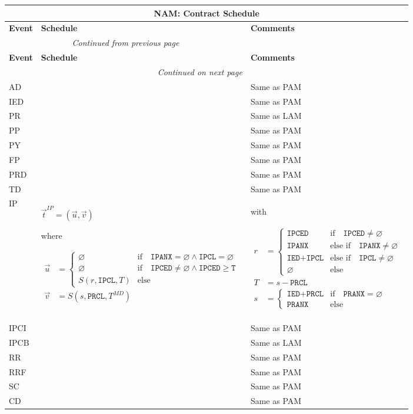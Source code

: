 \documentclass[9pt,oneside]{amsart}
\newenvironment{schedule}[1]{
	\begin{longtable}[H]{| p{0.05\textwidth} | p{0.5\textwidth} |  p{0.4\textwidth} |}
	\multicolumn{3}{c}{\textbf{#1: Contract Schedule}}\\
	\hline
	\textbf{Event} & \textbf{Schedule} & \textbf{Comments} \\
	\hline
	\endfirsthead
	\multicolumn{2}{c}{\textit{Continued from previous page}} \\
	\hline
	\textbf{Event} & \textbf{Schedule} & \textbf{Comments} \\
	\hline
	\endhead
	\hline \multicolumn{2}{r}{\textit{Continued on next page}} \\
	\endfoot
	\hline
	\endlastfoot
}{%
	\hline
	\end{longtable}
}
\newcommand{\attr}[1]{\texttt{#1}}
\newcommand{\sdl}[3]{S(#1,#2,#3)}
\newcommand{\undef}{\varnothing}
\begin{document}
\begin{schedule}{NAM}
	AD & & Same as PAM \\
	\hline
	IED & & Same as PAM \\
	\hline
	PR & & Same as LAM \\
	\hline
	PP & & Same as PAM \\
	\hline
	PY & & Same as PAM \\
	\hline
	FP & & Same as PAM \\
	\hline
	PRD & & Same as PAM \\
	\hline
	TD & & Same as PAM \\
	\hline
	IP & $\vec{t}^{IP} = (\vec{u},\vec{v})$ \par
		where \par
		{$\begin{aligned} \vec{u} &= \begin{cases} \undef & \text{if}\quad \attr{IPANX}=\undef\land\attr{IPCL}=\undef \\
							\undef & \text{if}\quad \attr{IPCED}\neq\undef\land\attr{IPCED}\geq\attr{T}\\
							\sdl{r}{\attr{IPCL}}{T} & \text{else} \end{cases} \\
				\vec{v} &= \sdl{s}{\attr{PRCL}}{T^{MD}} \end{aligned}$}
		 & with\par {$\begin{aligned} r &= \begin{cases} \attr{IPCED} & \text{if}\quad \attr{IPCED}\neq\undef \\
								\attr{IPANX} & \text{else if}\quad \attr{IPANX}\neq\undef \\
								\attr{IED}+\attr{IPCL} & \text{else if}\quad \attr{IPCL}\neq\undef \\
								\undef & \text{else} \end{cases} \\
						T &= s-\attr{PRCL} \\
						s &= \begin{cases} \attr{IED}+\attr{PRCL} & \text{if} \quad \attr{PRANX} = \undef \\
					   \attr{PRANX} & \text{else} \end{cases} \end{aligned}$} \\
	\hline
	IPCI & & Same as PAM \\
  	\hline
	IPCB & & Same as LAM \\
	\hline
	RR & & Same as PAM \\
	\hline
	RRF & & Same as PAM \\
  	\hline
	SC & & Same as PAM \\
	\hline
	CD & & Same as PAM \\
\end{schedule}
\end{document}
